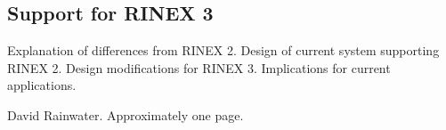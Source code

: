 \subsection*{Support for RINEX 3}

Explanation of differences from RINEX 2. Design of current system supporting RINEX 2. Design modifications for RINEX 3. Implications for current applications.

David Rainwater. Approximately one page. 


